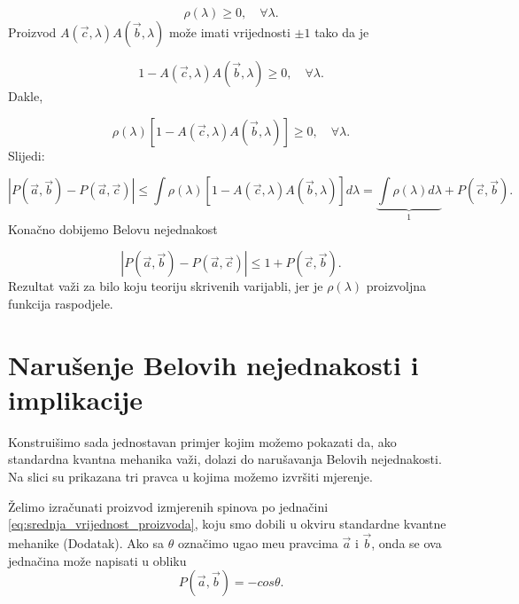 \begin{equation}
    \rho(\lambda) \ge0 , \quad \forall \lambda.
\end{equation}
Proizvod $A(\vec{c}, \lambda) A(\vec{b}, \lambda)$ može imati vrijednosti $\pm 1$ tako da je

\begin{equation}
    1 - A(\vec{c}, \lambda) A(\vec{b}, \lambda) \ge 0 , \quad \forall \lambda.
\end{equation}
Dakle,

\begin{equation}
    \rho (\lambda)[1 - A(\vec{c}, \lambda) A(\vec{b}, \lambda) ] \ge 0, \quad \forall \lambda.
\end{equation}
Slijedi:


\begin{equation}
    \left|{P(\vec{a}, \vec{b}) - P(\vec{a}, \vec{c})}\right| \le  \int  \rho (\lambda)  [1- A(\vec{c}, \lambda) A(\vec{b}, \lambda)  ]  d\lambda = \underbrace{\int \rho(\lambda)d\lambda}_{1} + P(\vec{c}, \vec{b}).
\end{equation}
Konačno dobijemo Belovu nejednakost

\begin{equation}
    \left|{P(\vec{a}, \vec{b}) - P(\vec{a}, \vec{c})}\right| \le 1 +  P(\vec{c}, \vec{b}).
\end{equation}
Rezultat važi za bilo koju teoriju skrivenih varijabli, jer je $\rho(\lambda)$ proizvoljna funkcija raspodjele.

\section{Narušenje Belovih nejednakosti i implikacije}

Konstruišimo sada jednostavan primjer kojim možemo pokazati da, ako standardna kvantna mehanika važi,  dolazi do narušavanja Belovih nejednakosti. Na slici
su prikazana tri pravca u kojima možemo izvršiti mjerenje.

Želimo izračunati proizvod izmjerenih spinova po jednačini \eqref{eq:srednja_vrijednost_proizvoda}, koju smo dobili u okviru standardne kvantne mehanike (Dodatak).
Ako sa $\theta$ ozna\v cimo ugao me\dj u pravcima $\vec{a}$ i $\vec{b}$, onda se ova jedna\v cina mo\v ze napisati u obliku
\begin{equation}
    P(\vec{a},\vec{b}) = -cos\theta.
\end{equation}\\


